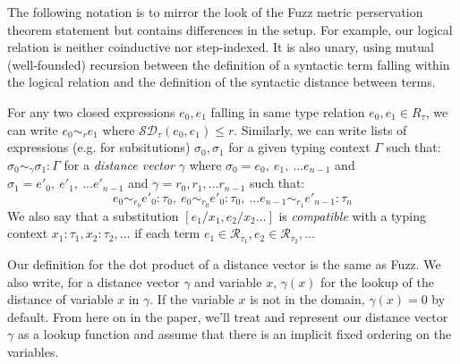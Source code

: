 The following notation is to mirror the look of the Fuzz metric perservation
theorem statement but contains differences in the setup. For example, our
logical relation is neither coinductive nor step-indexed. It is also unary,
using mutual (well-founded) recursion between the definition of a syntactic term
falling within the logical relation and the definition of the syntactic distance
between terms.

For any two closed expressions $e_0, e_1$ falling in same type relation $e_0,
e_1 \in R_\tau$, we can write $e_0 \sim_r e_1$ where $\mathcal{SD}_{\tau}(e_0,
e_1) \leq r$. Similarly, we can write lists of expressions (e.g. for
subsitutions) $\sigma_0, \sigma_1$ for a given typing context $\Gamma$ such
that: $\sigma_0 \sim_{\gamma} \sigma_1 : \Gamma$ for a \textit{distance vector}
$\gamma$
where
$\sigma_0 = e_0,~e_1,~\ldots e_{n-1}$ 
and $\sigma_1 = e'_0,~e'_1,~\ldots e'_{n-1}$ 
and $\gamma = r_0, r_1, \ldots r_{n-1}$ such that:
$$e_0 \sim_{r_0} e'_0 : \tau_0,~e_0 \sim_{r_0} e'_0 : \tau_0,~\ldots e_{n-1}
\sim_{r_1} e'_{n-1} : \tau_n$$
We also say that a substitution $[e_1/x_1, e_2/x_2 \ldots]$ is
\textit{compatible} with a typing context $x_1 : \tau_1, x_2 : \tau_2, \ldots$
if each term $e_1 \in \mathcal{R}_{\tau_1}, e_2 \in \mathcal{R}_{\tau_2},
\ldots$

Our definition for the dot product of a distance vector is the same as Fuzz. We
also write, for a distance vector $\gamma$ and variable $x$, $\gamma(x)$ for the
lookup of the distance of variable $x$ in $\gamma$. If the variable $x$ is not
in the domain, $\gamma(x) = 0$ by default. From here on in the paper, we'll
treat and represent our distance vector $\gamma$ as a lookup function and assume
that there is an implicit fixed ordering on the variables.

